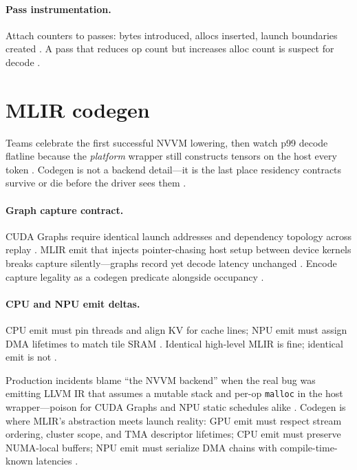 \paragraph{Pass instrumentation.} Attach counters to passes: bytes introduced, allocs inserted, launch boundaries created \citep{taxbreak2026}. A pass that reduces op count but increases alloc count is suspect for decode \citep{memoryfloor2026,yirage2026}.

\section{MLIR codegen}

Teams celebrate the first successful NVVM lowering, then watch p99 decode flatline because the \emph{platform} wrapper still constructs tensors on the host every token \citep{taxbreak2026,nvidia2024cudagraphs}. Codegen is not a backend detail---it is the last place residency contracts survive or die before the driver sees them \citep{yirage2026,chen2020compilerbasedhardw}.
\label{sec:ch14_mlir_codegen}

\paragraph{Graph capture contract.} CUDA Graphs require identical launch addresses and dependency topology across replay \citep{nvidia2024cudagraphs,taxbreak2026}. MLIR emit that injects pointer-chasing host setup between device kernels breaks capture silently---graphs record yet decode latency unchanged \citep{memoryfloor2026,yirage2026}. Encode capture legality as a codegen predicate alongside occupancy \citep{patel2025llminference,chen2020compilerbasedhardw}.

\paragraph{CPU and NPU emit deltas.} CPU emit must pin threads and align KV for cache lines; NPU emit must assign DMA lifetimes to match tile SRAM \citep{dlbook,amd2024aie,amd2024xdna}. Identical high-level MLIR is fine; identical emit is not \citep{yirage2026,liu2024deepseekv3}.

Production incidents blame ``the NVVM backend'' when the real bug was emitting LLVM IR that assumes a mutable stack and per-op \texttt{malloc} in the host wrapper---poison for CUDA Graphs and NPU static schedules alike \citep{nvidia2024cudagraphs,taxbreak2026}. Codegen is where MLIR's abstraction meets launch reality: GPU emit must respect stream ordering, cluster scope, and TMA descriptor lifetimes; CPU emit must preserve NUMA-local buffers; NPU emit must serialize DMA chains with compile-time-known latencies \citep{nvidia2022hopper,amd2024xdna}.


